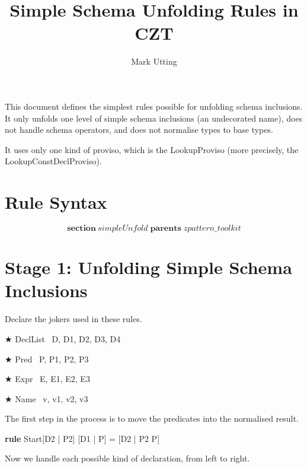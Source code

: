 \documentclass{article}
\title{Simple Schema Unfolding Rules in CZT}
\author{Mark Utting}
\newenvironment{zsection}{\[}{\]}
\newcommand{\SECTION}{\textbf{section}~}
\newcommand{\parents}{\mathrel{\textbf{parents}}}
\newenvironment{zedrule}[1]{\par\textbf{rule }#1\vspace{-1ex}\infrule}{\endinfrule}
\newcommand{\derives}{\derive{}}
\newenvironment{zedjoker}[1]{\par$\bigstar$ #1\ }{}
\begin{document}
\maketitle

This document defines the simplest rules possible for
unfolding schema inclusions.  It only unfolds one level of simple schema
inclusions (an undecorated name), does not handle
schema operators, and does not normalise types to base types.

It uses only one kind of proviso, which is the LookupProviso
(more precisely, the LookupConstDeclProviso).

\section*{Rule Syntax}

\begin{zsection}
  \SECTION simpleUnfold \parents zpattern\_toolkit
\end{zsection}

\section*{Stage 1: Unfolding Simple Schema Inclusions}

Declare the jokers used in these rules.

\begin{zedjoker}{DeclList} D, D1, D2, D3, D4 \end{zedjoker} \\
\begin{zedjoker}{Pred} P, P1, P2, P3 \end{zedjoker} \\
\begin{zedjoker}{Expr} E, E1, E2, E3 \end{zedjoker} \\
\begin{zedjoker}{Name} v, v1, v2, v3 \end{zedjoker} \\

\newcommand{\unfoldsTo}{\mathrel{\leadsto}}

The first step in the process is to move the predicates into
the normalised result.
\begin{zedrule}{Start}
   [D1 | true] \unfoldsTo [D2 | P2]
\derives
   [D1 | P] = [D2 | P2 \land P]
\end{zedrule}

Now we handle each possible kind of declaration, from left to right.
\end{document}
